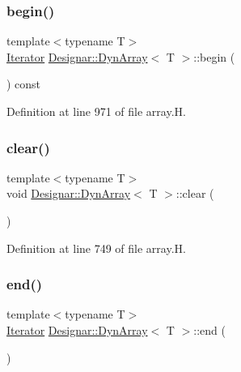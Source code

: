 \subsubsection{\texorpdfstring{begin()}{begin()}\hspace{0.1cm}{\footnotesize\ttfamily [2/2]}}
{\footnotesize\ttfamily template$<$typename T$>$ \\
\hyperlink{class_designar_1_1_dyn_array_1_1_iterator}{Iterator} \hyperlink{class_designar_1_1_dyn_array}{Designar\+::\+Dyn\+Array}$<$ T $>$\+::begin (\begin{DoxyParamCaption}{ }\end{DoxyParamCaption}) const\hspace{0.3cm}{\ttfamily [inline]}}



Definition at line 971 of file array.\+H.

\mbox{\label{class_designar_1_1_dyn_array_abea6b41f8373dc60753255f3c390507f}} 
\subsubsection{\texorpdfstring{clear()}{clear()}}
{\footnotesize\ttfamily template$<$typename T$>$ \\
void \hyperlink{class_designar_1_1_dyn_array}{Designar\+::\+Dyn\+Array}$<$ T $>$\+::clear (\begin{DoxyParamCaption}{ }\end{DoxyParamCaption})\hspace{0.3cm}{\ttfamily [inline]}}



Definition at line 749 of file array.\+H.

\mbox{\label{class_designar_1_1_dyn_array_a1a6bfcf9c4cd8d54138339b9313661f3}} 
\subsubsection{\texorpdfstring{end()}{end()}\hspace{0.1cm}{\footnotesize\ttfamily [1/2]}}
{\footnotesize\ttfamily template$<$typename T$>$ \\
\hyperlink{class_designar_1_1_dyn_array_1_1_iterator}{Iterator} \hyperlink{class_designar_1_1_dyn_array}{Designar\+::\+Dyn\+Array}$<$ T $>$\+::end (\begin{DoxyParamCaption}{ }\end{DoxyParamCaption})\hspace{0.3cm}{\ttfamily [inline]}}



